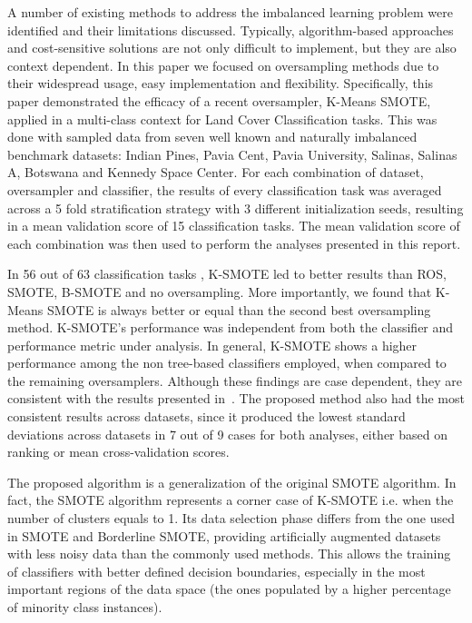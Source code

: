 \documentclass[remotesensing,article,submit,moreauthors,pdftex]{Definitions/mdpi}
\begin{document}
\begin{paracol}{2}
A number of existing methods to address the imbalanced learning problem were
identified and their limitations discussed. Typically, algorithm-based
approaches and cost-sensitive solutions are not only difficult to implement,
but they are also context dependent. In this paper we focused on oversampling
methods due to their widespread usage, easy implementation and flexibility.
Specifically, this paper demonstrated the efficacy of a recent oversampler,
K-Means SMOTE, applied in a multi-class context for Land Cover Classification
tasks. This was done with sampled data from seven well known and naturally
imbalanced benchmark datasets: Indian Pines, Pavia Cent,
Pavia University, Salinas, Salinas A, Botswana and Kennedy Space Center. For
each combination of dataset, oversampler and classifier, the results of every
classification task was averaged across a 5 fold stratification strategy with
3 different initialization seeds, resulting in a mean validation score of 15
classification tasks. The mean validation score of each combination was then
used to perform the analyses presented in this report.

In 56 out of 63 classification tasks , K-SMOTE led
to better results than ROS, SMOTE, B-SMOTE and no oversampling. More
importantly, we found that K-Means SMOTE is always better or equal than the
second best oversampling method. K-SMOTE's performance was independent from
both the classifier and performance metric under analysis. In general, K-SMOTE
shows a higher performance among the non tree-based classifiers employed, when
compared to the remaining oversamplers. Although these findings are case
dependent, they are consistent with the results presented
in~\cite{Douzas2018}. The proposed method also had the most consistent results
across datasets, since it produced the lowest standard deviations across
datasets in 7 out of 9 cases for both analyses, either based on ranking or
mean cross-validation scores.

The proposed algorithm is a generalization of the original SMOTE algorithm. In
fact, the SMOTE algorithm represents a corner case of K-SMOTE i.e. when the
number of clusters equals to 1. Its data selection phase differs from the one
used in SMOTE and Borderline SMOTE, providing artificially augmented datasets
with less noisy data than the commonly used methods. This allows the training
of classifiers with better defined decision boundaries, especially in the most
important regions of the data space (the ones populated by a higher percentage
of minority class instances).


\end{paracol}
\end{document}
